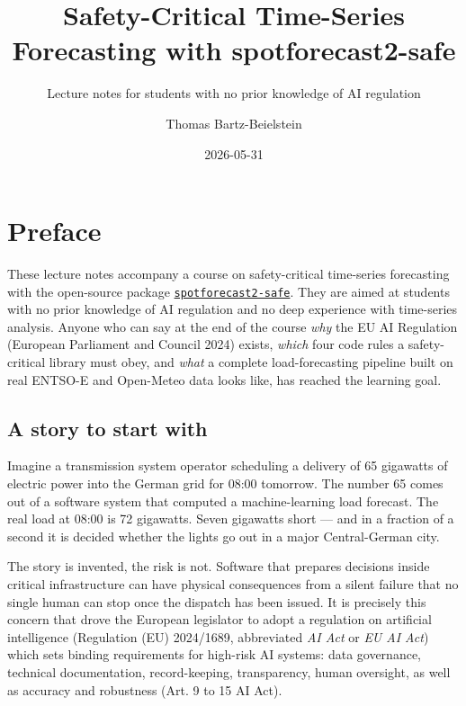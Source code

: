 \documentclass[
  english,
  letterpaper,
]{scrbook}
\title{Safety-Critical Time-Series Forecasting with spotforecast2-safe}
\subtitle{Lecture notes for students with no prior knowledge of AI
regulation}
\author{Thomas Bartz-Beielstein}
\date{2026-05-31}
\renewcommand*\contentsname{Table of contents}
\newcommand\contentsname{Table of contents}
\begin{document}
\frontmatter
\maketitle

\renewcommand*\contentsname{Table of contents}
{
\setcounter{tocdepth}{2}
\tableofcontents
}

\mainmatter
{}

\chapter*{Preface}\label{preface}


These lecture notes accompany a course on safety-critical time-series
forecasting with the open-source package
\href{https://github.com/bartzbeielstein/spotforecast2-safe}{\texttt{spotforecast2-safe}}.
They are aimed at students with no prior knowledge of AI regulation and
no deep experience with time-series analysis. Anyone who can say at the
end of the course \emph{why} the EU AI Regulation (European Parliament
and Council 2024) exists, \emph{which} four code rules a safety-critical
library must obey, and \emph{what} a complete load-forecasting pipeline
built on real ENTSO-E and Open-Meteo data looks like, has reached the
learning goal.

\section*{A story to start with}\label{sec-motivation}


Imagine a transmission system operator scheduling a delivery of 65
gigawatts of electric power into the German grid for 08:00 tomorrow. The
number 65 comes out of a software system that computed a
machine-learning load forecast. The real load at 08:00 is 72 gigawatts.
Seven gigawatts short --- and in a fraction of a second it is decided
whether the lights go out in a major Central-German city.

The story is invented, the risk is not. Software that prepares decisions
inside critical infrastructure can have physical consequences from a
silent failure that no single human can stop once the dispatch has been
issued. It is precisely this concern that drove the European legislator
to adopt a regulation on artificial intelligence (Regulation (EU)
2024/1689, abbreviated \emph{AI Act} or \emph{EU AI Act}) which sets
binding requirements for high-risk AI systems: data governance,
technical documentation, record-keeping, transparency, human oversight,
as well as accuracy and robustness (Art. 9 to 15 AI Act).
\end{document}
